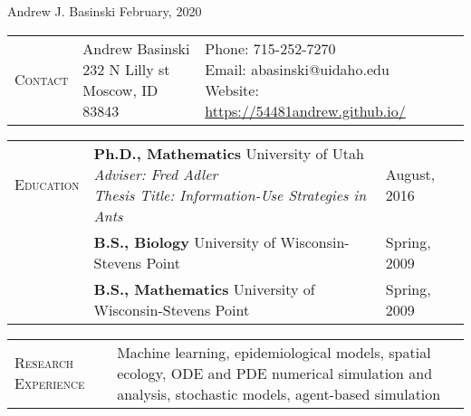 \documentclass[11pt]{article}
\newcommand{\cellone}{2.5cm}
\newcommand{\celltwo}{12cm}
\newcommand{\cellthree}{4cm}
\newcommand{\incellone}{3cm}
\newcommand{\incelltwo}{5cm}
\newcommand{\incellthree}{10cm}
\newcommand{\spa}{\vspace{.4in}}
\begin{document}
{\huge Andrew J. Basinski \hspace{2.5in} February, 2020}

\noindent\makebox[\linewidth]{\rule{\linewidth}{0.4pt}}

\spa

\begin{tabularx}{\textwidth}{p{\incellone} p{\incelltwo} p{\incellthree}}

  C\textsc{ontact} & \parbox[t]{5 cm}{Andrew Basinski \\ 232 N Lilly st \\ Moscow, ID 83843} & \parbox[t]{8cm}{Phone: 715-252-7270\\
    Email: abasinski@uidaho.edu \\
    Website: \url{https://54481andrew.github.io/}
  } \\

\end{tabularx}

\spa

\begin{tabularx}{\textwidth}{p{\cellone} p{\celltwo} p{\cellthree}}
E\textsc{ducation} & \parbox[t]{13cm}{{\bf Ph.D., Mathematics} University of Utah \\  \emph{Adviser: Fred Adler} \\ \emph{Thesis Title: Information-Use Strategies in Ants}} &  August, 2016 \\[.5in]   

		          & \parbox[t][0cm]{13cm}{{\bf B.S., Biology} University of Wisconsin-Stevens Point} & Spring, 2009 \\
		          & \parbox[t]{13cm}{{\bf B.S., Mathematics} University of Wisconsin-Stevens Point} & Spring, 2009 \\
\end{tabularx}


\spa

\begin{tabularx}{\textwidth}{p{\cellone} p{\celltwo}}
  \parbox[t][0cm]{\cellone}{R\textsc{esearch} E\textsc{xperience}} &  \parbox[t][0cm]{12cm}{
    Machine learning, epidemiological models, spatial ecology, ODE and PDE numerical simulation and analysis, stochastic models, agent-based simulation}
\end{tabularx}

\spa
\spa
\end{document}
